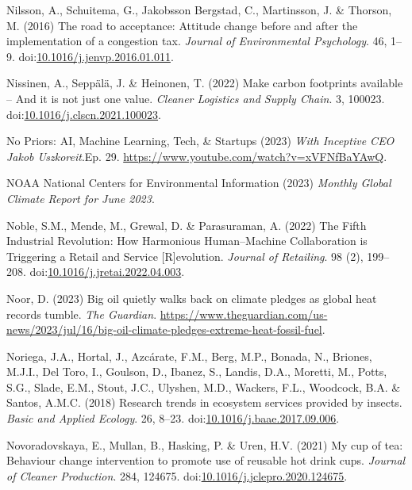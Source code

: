 \documentclass[
  letterpaper,
  DIV=11,
  numbers=noendperiod]{scrartcl}
\newlength{\cslhangindent}
\newenvironment{CSLReferences}[2] %
 {\begin{list}{}{%
  \setlength{\itemindent}{0pt}
  \setlength{\leftmargin}{0pt}
  \setlength{\parsep}{0pt}
  \ifodd #1
   \setlength{\leftmargin}{\cslhangindent}
   \setlength{\itemindent}{-1\cslhangindent}
  \fi
  \setlength{\itemsep}{#2\baselineskip}}}
 {\end{list}}
\begin{document}
\begin{CSLReferences}{0}{1}
Nilsson, A., Schuitema, G., Jakobsson Bergstad, C., Martinsson, J. \&
Thorson, M. (2016) The road to acceptance: {Attitude} change before and
after the implementation of a congestion tax. \emph{Journal of
Environmental Psychology}. 46, 1--9.
doi:\href{https://doi.org/10.1016/j.jenvp.2016.01.011}{10.1016/j.jenvp.2016.01.011}.

Nissinen, A., Seppälä, J. \& Heinonen, T. (2022) Make carbon footprints
available -- {And} it is not just one value. \emph{Cleaner Logistics and
Supply Chain}. 3, 100023.
doi:\href{https://doi.org/10.1016/j.clscn.2021.100023}{10.1016/j.clscn.2021.100023}.

No Priors: AI, Machine Learning, Tech, \& Startups (2023) \emph{With
{Inceptive CEO Jakob Uszkoreit}}.Ep. 29.
\url{https://www.youtube.com/watch?v=xVFNfBaYAwQ}.

NOAA National Centers for Environmental Information (2023) \emph{Monthly
{Global Climate Report} for {June} 2023}.

Noble, S.M., Mende, M., Grewal, D. \& Parasuraman, A. (2022) The {Fifth
Industrial Revolution}: {How Harmonious Human}--{Machine Collaboration}
is {Triggering} a {Retail} and {Service} {[}{R}{]}evolution.
\emph{Journal of Retailing}. 98 (2), 199--208.
doi:\href{https://doi.org/10.1016/j.jretai.2022.04.003}{10.1016/j.jretai.2022.04.003}.

Noor, D. (2023) Big oil quietly walks back on climate pledges as global
heat records tumble. \emph{The Guardian}.
\url{https://www.theguardian.com/us-news/2023/jul/16/big-oil-climate-pledges-extreme-heat-fossil-fuel}.

Noriega, J.A., Hortal, J., Azcárate, F.M., Berg, M.P., Bonada, N.,
Briones, M.J.I., Del Toro, I., Goulson, D., Ibanez, S., Landis, D.A.,
Moretti, M., Potts, S.G., Slade, E.M., Stout, J.C., Ulyshen, M.D.,
Wackers, F.L., Woodcock, B.A. \& Santos, A.M.C. (2018) Research trends
in ecosystem services provided by insects. \emph{Basic and Applied
Ecology}. 26, 8--23.
doi:\href{https://doi.org/10.1016/j.baae.2017.09.006}{10.1016/j.baae.2017.09.006}.

Novoradovskaya, E., Mullan, B., Hasking, P. \& Uren, H.V. (2021) My cup
of tea: {Behaviour} change intervention to promote use of reusable hot
drink cups. \emph{Journal of Cleaner Production}. 284, 124675.
doi:\href{https://doi.org/10.1016/j.jclepro.2020.124675}{10.1016/j.jclepro.2020.124675}.


\end{CSLReferences}
\end{document}
